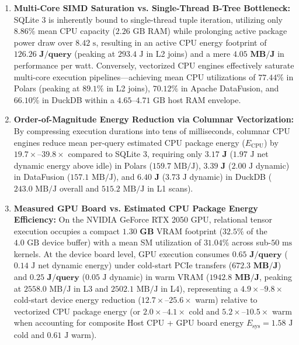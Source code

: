 \documentclass[10pt,a4paper]{article}
\begin{document}
\begin{enumerate}[leftmargin=1.5em,itemsep=2pt]
    \item \textbf{Multi-Core SIMD Saturation vs. Single-Thread B-Tree Bottleneck:} SQLite 3 is inherently bound to single-thread tuple iteration, utilizing only $8.86\%$ mean CPU capacity ($2.26\text{ GB}$ RAM) while prolonging active package power draw over $8.42\text{ s}$, resulting in an active CPU energy footprint of $\mathbf{126.26\text{ J/query}}$ (peaking at $293.4\text{ J}$ in L2 joins) and a mere $\mathbf{4.05\text{ MB/J}}$ in performance per watt. Conversely, vectorized CPU engines effectively saturate multi-core execution pipelines---achieving mean CPU utilizations of $\mathbf{77.44\%}$ in Polars (peaking at $89.1\%$ in L2 joins), $\mathbf{70.12\%}$ in Apache DataFusion, and $\mathbf{66.10\%}$ in DuckDB within a $4.65\text{--}4.71\text{ GB}$ host RAM envelope.
    \item \textbf{Order-of-Magnitude Energy Reduction via Columnar Vectorization:} By compressing execution durations into tens of milliseconds, columnar CPU engines reduce mean per-query estimated CPU package energy ($E_{\text{CPU}}$) by $19.7\times\text{--}39.8\times$ compared to SQLite 3, requiring only $\mathbf{3.17\text{ J}}$ ($1.97\text{ J}$ net dynamic energy above idle) in Polars ($159.7\text{ MB/J}$), $\mathbf{3.39\text{ J}}$ ($2.00\text{ J}$ dynamic) in DataFusion ($157.1\text{ MB/J}$), and $\mathbf{6.40\text{ J}}$ ($3.73\text{ J}$ dynamic) in DuckDB ($243.0\text{ MB/J}$ overall and $515.2\text{ MB/J}$ in L1 scans).
    \item \textbf{Measured GPU Board vs. Estimated CPU Package Energy Efficiency:} On the NVIDIA GeForce RTX 2050 GPU, relational tensor execution occupies a compact $\mathbf{1.30\text{ GB}}$ VRAM footprint ($32.5\%$ of the $4.0\text{ GB}$ device buffer) with a mean SM utilization of $\mathbf{31.04\%}$ across sub-$50\text{ ms}$ kernels. At the device board level, GPU execution consumes $\mathbf{0.65\text{ J/query}}$ ($0.14\text{ J}$ net dynamic energy) under cold-start PCIe transfers ($\mathbf{672.3\text{ MB/J}}$) and $\mathbf{0.25\text{ J/query}}$ ($0.05\text{ J}$ dynamic) in warm VRAM ($\mathbf{1942.8\text{ MB/J}}$, peaking at $2558.0\text{ MB/J}$ in L3 and $2502.1\text{ MB/J}$ in L4), representing a $\mathbf{4.9\times\text{--}9.8\times}$ cold-start device energy reduction ($12.7\times\text{--}25.6\times$ warm) relative to vectorized CPU package energy (or $2.0\times\text{--}4.1\times$ cold and $5.2\times\text{--}10.5\times$ warm when accounting for composite Host CPU + GPU board energy $E_{\text{sys}} = 1.58\text{ J}$ cold and $0.61\text{ J}$ warm).
\end{enumerate}
\end{document}
